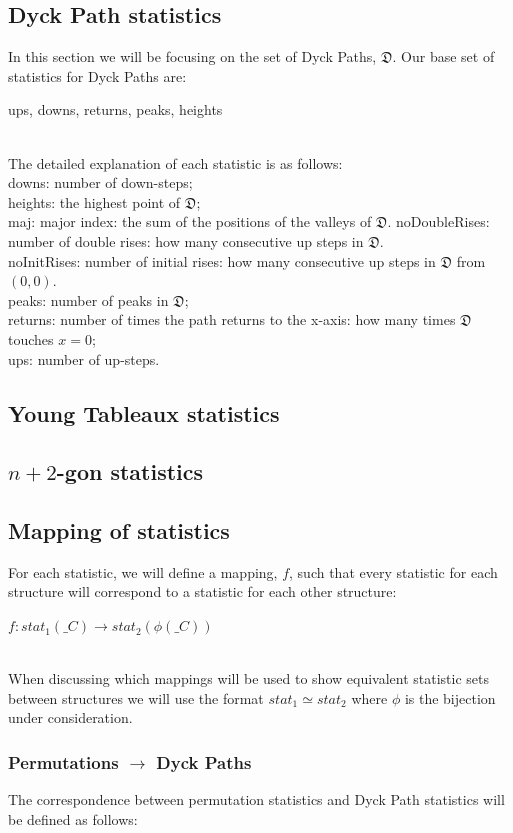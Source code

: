\documentclass[12pt]{article}
\newcommand{\DyckP}{\mathfrak{D}}
\begin{document}
\subsection{Dyck Path statistics}
In this section we will be focusing on the set of Dyck Paths, $\DyckP$. Our base set of statistics for Dyck Paths are:\\ \centerline{ups, downs, returns, peaks, heights}\\
The detailed explanation of each statistic is as follows:\\
downs: number of down-steps;\\
heights: the highest point of $\DyckP$;\\
maj: major index: the sum of the positions of the valleys of $\DyckP$.
noDoubleRises: number of double rises: how many consecutive up steps in $\DyckP$.\\
noInitRises: number of initial rises: how many consecutive up steps in $\DyckP$ from $(0,0)$.\\
peaks: number of peaks in $\DyckP$;\\
returns: number of times the path returns to the x-axis: how many times $\DyckP$ touches $x=0$;\\
ups: number of up-steps.\\

\subsection{Young Tableaux statistics}

\subsection{$n+2$-gon statistics}

\subsection{Mapping of statistics}
For each statistic, we will define a mapping, $f$, such that every statistic for each structure will correspond to a statistic for each other structure:\\
\centerline{$f: stat_1({\mathfrak_{C}}) \rightarrow stat_2(\phi(\mathfrak_{C}))$}\\
When discussing which mappings will be used to show equivalent statistic sets between structures we will use the format $stat_1 \simeq stat_2$ where $\phi$ is the bijection under consideration.

\subsubsection{Permutations $\rightarrow$ Dyck Paths}
The correspondence between permutation statistics and Dyck Path statistics will be defined as follows:
\end{document}
